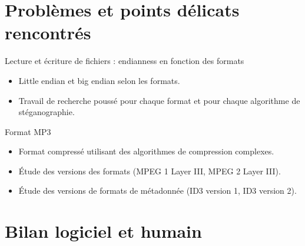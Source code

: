 \documentclass{beamer}
\begin{document}
  
  
  \section{Problèmes et points délicats rencontrés} 
  
  \begin{frame}
  
	\begin{block}{Lecture et écriture de fichiers : endianness en fonction des formats}
	\begin{itemize}
	[circle]

	\item Little endian et big endian selon les formats. 
	\item Travail de recherche poussé pour chaque format et pour chaque 
	algorithme de stéganographie.
	\end{itemize}
	\end{block}
		
	\begin{block}{Format MP3}
	\begin{itemize}
	[circle]
	\item Format compressé utilisant des algorithmes de compression complexes.
	\item Étude des versions des formats (MPEG 1 Layer III, MPEG 2 Layer III). 
	\item Étude des versions de formats de métadonnée (ID3 version 1, ID3 version 2). 
	\end{itemize}
	\end{block}
	
	\end{frame}
  
  
  
  \section{Bilan logiciel et humain}
  
\end{document}

